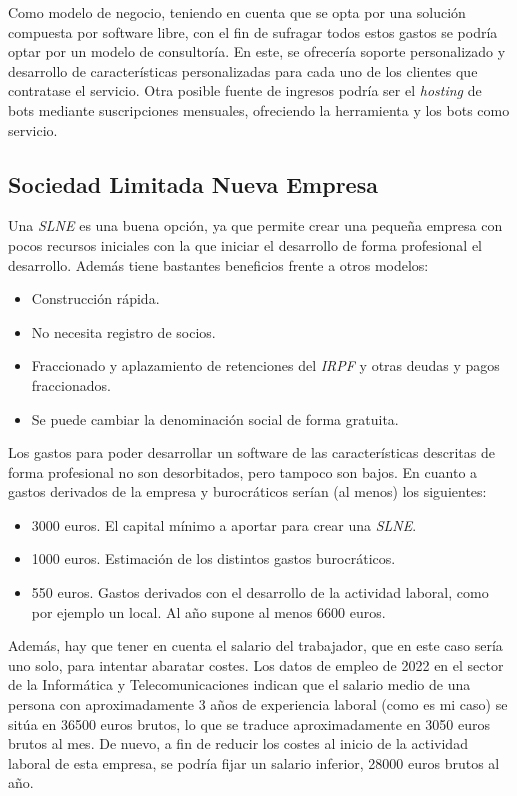 Como modelo de negocio, teniendo en cuenta que se opta por una solución compuesta por software libre, con el fin de sufragar todos estos gastos se podría optar por un modelo de consultoría. En este, se ofrecería soporte personalizado y desarrollo de características personalizadas para cada uno de los clientes que contratase el servicio. Otra posible fuente de ingresos podría ser el \textit{hosting} de bots mediante suscripciones mensuales, ofreciendo la herramienta y los bots como servicio.

\subsection{Sociedad Limitada Nueva Empresa}

Una \textit{SLNE} es una buena opción, ya que permite crear una pequeña empresa con pocos recursos iniciales con la que iniciar el desarrollo de forma profesional el desarrollo. Además tiene bastantes beneficios frente a otros modelos:

\begin{itemize}
	\item Construcción rápida.
	\item No necesita registro de socios.
	\item Fraccionado y aplazamiento de retenciones del \textit{IRPF} y otras deudas y pagos fraccionados.
	\item Se puede cambiar la denominación social de forma gratuita.
\end{itemize}

Los gastos para poder desarrollar un software de las características descritas de forma profesional no son desorbitados, pero tampoco son bajos. En cuanto a gastos derivados de la empresa y burocráticos serían (al menos) los siguientes:

\begin{itemize}
	\item 3000 euros. El capital mínimo a aportar para crear una \textit{SLNE}.
	\item 1000 euros. Estimación de los distintos gastos burocráticos.
	\item 550 euros. Gastos derivados con el desarrollo de la actividad laboral, como por ejemplo un local. Al año supone al menos 6600 euros.
\end{itemize}

Además, hay que tener en cuenta el salario del trabajador, que en este caso sería uno solo, para intentar abaratar costes. Los datos de empleo de 2022 en el sector de la Informática y Telecomunicaciones indican que el salario medio de una persona con aproximadamente 3 años de experiencia laboral (como es mi caso) se sitúa en 36500 euros brutos, lo que se traduce aproximadamente en 3050 euros brutos al mes. De nuevo, a fin de reducir los costes al inicio de la actividad laboral de esta empresa, se podría fijar un salario inferior, 28000 euros brutos al año.

